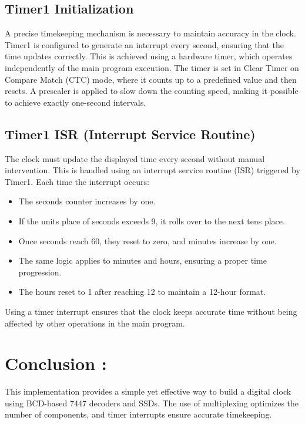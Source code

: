 \documentclass[12pt]{article}
\begin{document}
	\subsection*{Timer1 Initialization}
	A precise timekeeping mechanism is necessary to maintain accuracy in the clock. Timer1 is configured to generate an interrupt every second, ensuring that the time updates correctly. This is achieved using a hardware timer, which operates independently of the main program execution. The timer is set in Clear Timer on Compare Match (CTC) mode, where it counts up to a predefined value and then resets. A prescaler is applied to slow down the counting speed, making it possible to achieve exactly one-second intervals.
	
	\subsection*{Timer1 ISR (Interrupt Service Routine)}
	The clock must update the displayed time every second without manual intervention. This is handled using an interrupt service routine (ISR) triggered by Timer1. Each time the interrupt occurs:
	\begin{itemize}
		\item The seconds counter increases by one.
		\item If the units place of seconds exceeds 9, it rolls over to the next tens place.
		\item Once seconds reach 60, they reset to zero, and minutes increase by one.
		\item The same logic applies to minutes and hours, ensuring a proper time progression.
		\item The hours reset to 1 after reaching 12 to maintain a 12-hour format.
	\end{itemize}
	Using a timer interrupt ensures that the clock keeps accurate time without being affected by other operations in the main program.
	
	
	\section{Conclusion : }
	This implementation provides a simple yet effective way to build a digital clock using BCD-based 7447 decoders and SSDs. The use of multiplexing optimizes the number of components, and timer interrupts ensure accurate timekeeping.
	
\end{document}
